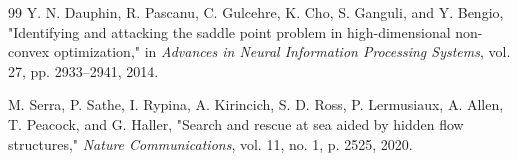 \documentclass[lettersize,journal]{IEEEtran}
\begin{document}
\begin{thebibliography}{99}
 Y. N. Dauphin, R. Pascanu, C. Gulcehre, K. Cho, S. Ganguli,
and Y. Bengio, "Identifying and attacking the saddle point problem in
high-dimensional non-convex optimization," in \textit{Advances in Neural
Information Processing Systems}, vol. 27, pp. 2933--2941, 2014.

 M. Serra, P. Sathe, I. Rypina, A. Kirincich, S. D. Ross,
P. Lermusiaux, A. Allen, T. Peacock, and G. Haller, "Search and rescue
at sea aided by hidden flow structures," \textit{Nature Communications},
vol. 11, no. 1, p. 2525, 2020.

\end{thebibliography}
\end{document}

